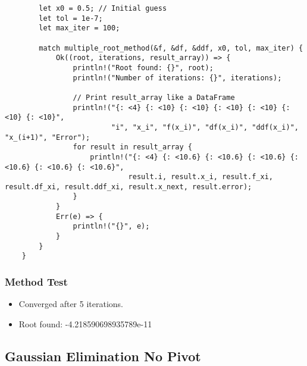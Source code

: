 \documentclass{article}
\begin{document}
\begin{verbatim}
        let x0 = 0.5; // Initial guess
        let tol = 1e-7;
        let max_iter = 100;

        match multiple_root_method(&f, &df, &ddf, x0, tol, max_iter) {
            Ok((root, iterations, result_array)) => {
                println!("Root found: {}", root);
                println!("Number of iterations: {}", iterations);

                // Print result_array like a DataFrame
                println!("{: <4} {: <10} {: <10} {: <10} {: <10} {: <10} {: <10}",
                         "i", "x_i", "f(x_i)", "df(x_i)", "ddf(x_i)", "x_(i+1)", "Error");
                for result in result_array {
                    println!("{: <4} {: <10.6} {: <10.6} {: <10.6} {: <10.6} {: <10.6} {: <10.6}",
                             result.i, result.x_i, result.f_xi, result.df_xi, result.ddf_xi, result.x_next, result.error);
                }
            }
            Err(e) => {
                println!("{}", e);
            }
        }
    }
                \end{verbatim}
        \subsubsection{Method Test}
            \begin{itemize}
                \item Converged after 5 iterations.
                \item Root found: -4.218590698935789e-11
            \end{itemize}


    \subsection{Gaussian Elimination No Pivot}
\end{document}
